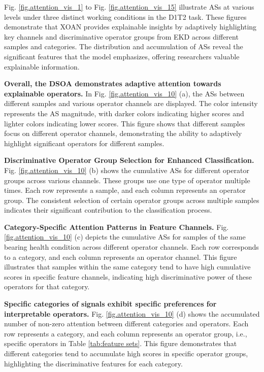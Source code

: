 \documentclass[lettersize,journal]{IEEEtran}
\begin{document}
Fig. \ref{fig.attention_vis_1} to Fig. \ref{fig.attention_vis_15} illustrate ASs at various levels under three distinct working conditions in the D1T2 task. These figures demonstrate that XOAN provides explainable insights by adaptively highlighting key channels and discriminative operator groups from EKD across different samples and categories. The distribution and accumulation of ASs reveal the significant features that the model emphasizes, offering researchers valuable explainable information.



\textbf{Overall, the DSOA demonstrates adaptive attention towards explainable operators.}
In Fig. \ref{fig.attention_vis_10} (a), the ASs between different samples and various operator channels are displayed. The color intensity represents the AS magnitude, with darker colors indicating higher scores and lighter colors indicating lower scores. This figure shows that different samples focus on different operator channels, demonstrating the ability to adaptively highlight significant operators for different samples. 

\textbf{Discriminative Operator Group Selection for Enhanced Classification.}
Fig. \ref{fig.attention_vis_10} (b) shows the cumulative ASs for different operator groups across various channels. These groups use one type of operator multiple times. Each row represents a sample, and each column represents an operator group. The consistent selection of certain operator groups across multiple samples indicates their significant contribution to the classification process. 

\textbf{Category-Specific Attention Patterns in Feature Channels.}
Fig. \ref{fig.attention_vis_10} (c) depicts the cumulative ASs for samples of the same bearing health condition across different operator channels. Each row corresponds to a category, and each column represents an operator channel. This figure illustrates that samples within the same category tend to have high cumulative scores in specific feature channels, indicating high discriminative power of these operators for that category.

\textbf{Specific categories of signals exhibit specific preferences for interpretable operators.}
Fig. \ref{fig.attention_vis_10} (d) shows the accumulated number of non-zero attention between different categories and operators. Each row represents a category, and each column represents an operator group, i.e., specific operators in Table \ref{tab:feature sets}. This figure demonstrates that different categories tend to accumulate high scores in specific operator groups, highlighting the discriminative features for each category. 
\end{document}
